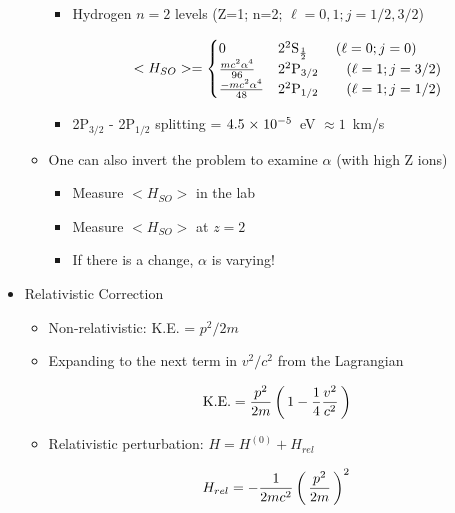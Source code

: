 \documentclass[12pt,letterpaper]{article}
\begin{document}
\begin{Aenumerate}
\begin{itemize}
\begin{itemize}
\begin{itemize}
		\item Hydrogen $n=2$ levels (Z=1; n=2; $\ell = 0,1; j= 1/2, 3/2$)

\begin{equation*}
<H_{SO}> = 
  \begin{cases}
	0 &  2 ^2{\rm S}_{\frac{1}{2}} \quad\quad (\ell = 0; j=0) \\
     \frac{mc^2 \alpha^4}{96} &  2 ^2{\rm P}_{3/2} \quad\quad (\ell=1; j=3/2) \\
     \frac{-mc^2 \alpha^4}{48} &  2 ^2{\rm P}_{1/2} \quad\quad (\ell=1; j=1/2) \\
  \end{cases}
\end{equation*}

		\item 2P$_{3/2}$ - 2P$_{1/2}$ splitting = $4.5 {\; \times \; 10^{-5}}$~eV 
		  $\approx 1$~km/s

		\end{itemize}

	\item One can also invert the problem to examine $\alpha$ (with high Z ions)
		\begin{itemize}
		\item Measure $<H_{SO}>$ in the lab
		\item Measure $<H_{SO}>$ at $z=2$
		\item If there is a change, $\alpha$ is varying!
		\end{itemize}

	\end{itemize}

  \item Relativistic Correction

	\begin{itemize}
	\item Non-relativistic:  K.E. = $p^2/2m$
	\item Expanding to the next term in $v^2/c^2$ from the Lagrangian

\begin{equation}
\text{K.E.} = \frac{p^2}{2m} \left ( \, 1 - \frac{1}{4} \frac{v^2}{c^2} \, \right )
\end{equation}

	\item Relativistic perturbation:  $H = H^{(0)} + H_{rel}$

\begin{equation}
H_{rel} = -\frac{1}{2mc^2} \left ( \, \frac{p^2}{2m} \, \right )^2
\end{equation}


\end{itemize}
\end{itemize}
\end{Aenumerate}
\end{document}
